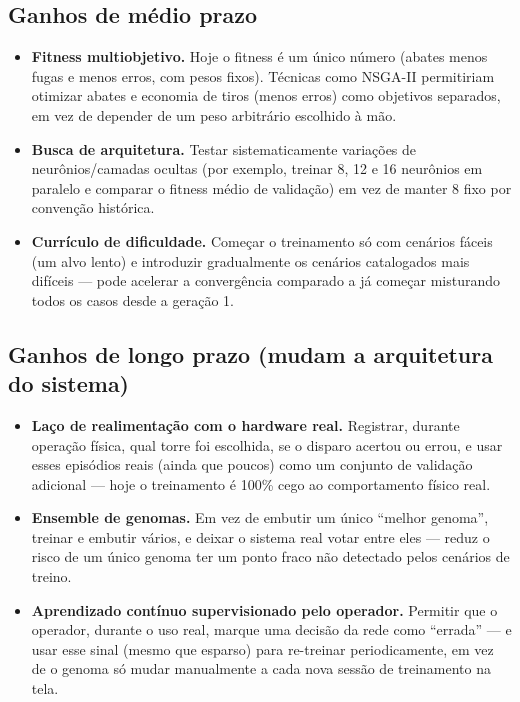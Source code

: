 \documentclass[11pt,a4paper]{article}
\begin{document}
\subsection{Ganhos de médio prazo}

\begin{itemize}[leftmargin=1.4em]
  \item \textbf{Fitness multiobjetivo.} Hoje o fitness é um único número (abates menos fugas e menos erros,
    com pesos fixos). Técnicas como NSGA-II permitiriam otimizar abates e economia de tiros
    (menos erros) como objetivos separados, em vez de depender de um peso arbitrário escolhido à
    mão.
  \item \textbf{Busca de arquitetura.} Testar sistematicamente variações de neurônios/camadas
    ocultas (por exemplo, treinar 8, 12 e 16 neurônios em paralelo e comparar o fitness médio de
    validação) em vez de manter 8 fixo por convenção histórica.
  \item \textbf{Currículo de dificuldade.} Começar o treinamento só com cenários fáceis
    (um alvo lento) e introduzir gradualmente os cenários catalogados mais difíceis — pode
    acelerar a convergência comparado a já começar misturando todos os casos desde a geração 1.
\end{itemize}

\subsection{Ganhos de longo prazo (mudam a arquitetura do sistema)}

\begin{itemize}[leftmargin=1.4em]
  \item \textbf{Laço de realimentação com o hardware real.} Registrar, durante operação física,
    qual torre foi escolhida, se o disparo acertou ou errou, e usar esses episódios reais (ainda
    que poucos) como um conjunto de validação adicional — hoje o treinamento é 100\% cego ao
    comportamento físico real.
  \item \textbf{Ensemble de genomas.} Em vez de embutir um único ``melhor genoma'', treinar e
    embutir vários, e deixar o sistema real votar entre eles — reduz o risco de um único genoma
    ter um ponto fraco não detectado pelos cenários de treino.
  \item \textbf{Aprendizado contínuo supervisionado pelo operador.} Permitir que o operador,
    durante o uso real, marque uma decisão da rede como ``errada'' — e usar esse sinal (mesmo que
    esparso) para re-treinar periodicamente, em vez de o genoma só mudar manualmente a cada nova
    sessão de treinamento na tela.
\end{itemize}
\end{document}
